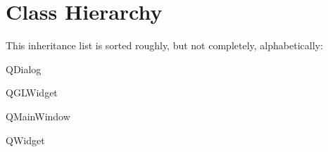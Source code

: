 \section{Class Hierarchy}
This inheritance list is sorted roughly, but not completely, alphabetically\+:\begin{DoxyCompactList}
\item {}
\item Q\+Dialog\begin{DoxyCompactList}
\item {}
\end{DoxyCompactList}
\item Q\+G\+L\+Widget\begin{DoxyCompactList}
\item {}
\begin{DoxyCompactList}
\item {}
\end{DoxyCompactList}
\end{DoxyCompactList}
\item Q\+Main\+Window\begin{DoxyCompactList}
\item {}
\end{DoxyCompactList}
\item Q\+Widget\begin{DoxyCompactList}
\item {}
\end{DoxyCompactList}
\item {}
\begin{DoxyCompactList}
\item {}
\item {}
\item {}
\item {}
\item {}
\item {}

\end{DoxyCompactList}
\end{DoxyCompactList}
